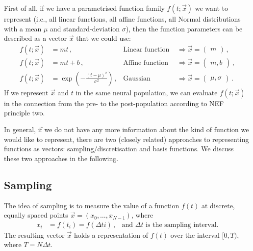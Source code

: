 \documentclass[10pt,letterpaper,oneside]{article}
\begin{document}
First of all, if we have a parametrised function family $f(t; \vec x)$ we want to represent (i.e., all linear functions, all affine functions, all Normal distributions with a mean $\mu$ and standard-deviation $\sigma$), then the function parameters can be described as a vector $\vec x$ that we could use:
\begin{align*}
	f(t; \vec x) &= m t \,, & \text{Linear function } &\Rightarrow \vec x = \begin{pmatrix}m\end{pmatrix} \,, \\
	f(t; \vec x) &= m t + b \,, & \text{Affine function } &\Rightarrow \vec x =  \begin{pmatrix}m, b\end{pmatrix} \,, \\
	f(t; \vec x) &= \exp\left(-\frac{(t - \mu)^2}{\sigma^2}\right) \,,  & \text{Gaussian } &\Rightarrow \vec x =  \begin{pmatrix}\mu, \sigma\end{pmatrix} \,.
\end{align*}
If we represent $\vec x$ and $t$ in the same neural population, we can evaluate $f(t; \vec x)$ in the connection from the pre- to the post-population according to NEF principle two.

In general, if we do not have any more information about the kind of function we would like to represent, there are two (closely related) approaches to representing functions as vectors: sampling/discretisation and basis functions. We discuss these two approaches in the following.


\subsection{Sampling}

The idea of sampling is to measure the value of a function $f(t)$ at discrete, equally spaced points $\vec x = ( x_0, \ldots, x_{N - 1} )$, where
\begin{align*}
	x_i &= f(t_i) = f(\Delta t i) \,, & \text{and } \Delta t \text{ is the sampling interval.}
\end{align*}
The resulting vector $\vec x$ holds a representation of $f(t)$ over the interval $[0, T)$, where $T = N \Delta t$.
\end{document}
